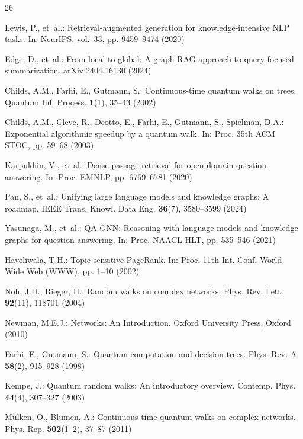 \documentclass{llncs}
\begin{document}
\begin{thebibliography}{26}
\small
\setlength{\itemsep}{2pt}
\providecommand{\url}[1]{\texttt{#1}}
\providecommand{\urlprefix}{URL }

Lewis, P., et~al.: Retrieval-augmented generation for knowledge-intensive NLP tasks. In: NeurIPS, vol.~33, pp. 9459--9474 (2020)

Edge, D., et~al.: From local to global: A graph RAG approach to query-focused summarization. arXiv:2404.16130 (2024)

Childs, A.M., Farhi, E., Gutmann, S.: Continuous-time quantum walks on trees. Quantum Inf. Process. \textbf{1}(1), 35--43 (2002)

Childs, A.M., Cleve, R., Deotto, E., Farhi, E., Gutmann, S., Spielman, D.A.: Exponential algorithmic speedup by a quantum walk. In: Proc. 35th ACM STOC, pp. 59--68 (2003)

Karpukhin, V., et~al.: Dense passage retrieval for open-domain question answering. In: Proc. EMNLP, pp. 6769--6781 (2020)

Pan, S., et~al.: Unifying large language models and knowledge graphs: A roadmap. IEEE Trans. Knowl. Data Eng. \textbf{36}(7), 3580--3599 (2024)

Yasunaga, M., et~al.: QA-GNN: Reasoning with language models and knowledge graphs for question answering. In: Proc. NAACL-HLT, pp. 535--546 (2021)

Haveliwala, T.H.: Topic-sensitive PageRank. In: Proc. 11th Int. Conf. World Wide Web (WWW), pp. 1--10 (2002)

Noh, J.D., Rieger, H.: Random walks on complex networks. Phys. Rev. Lett. \textbf{92}(11), 118701 (2004)

Newman, M.E.J.: Networks: An Introduction. Oxford University Press, Oxford (2010)

Farhi, E., Gutmann, S.: Quantum computation and decision trees. Phys. Rev. A \textbf{58}(2), 915--928 (1998)

Kempe, J.: Quantum random walks: An introductory overview. Contemp. Phys. \textbf{44}(4), 307--327 (2003)

M{\"u}lken, O., Blumen, A.: Continuous-time quantum walks on complex networks. Phys. Rep. \textbf{502}(1--2), 37--87 (2011)


\end{thebibliography}
\end{document}
